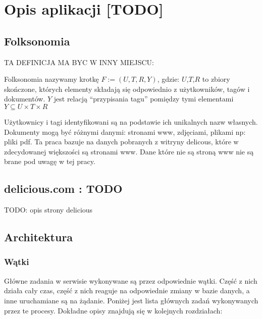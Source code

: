 \chapter{Opis aplikacji [TODO]}

\section{Folksonomia}

TA DEFINICJA MA BYC W INNY MIEJSCU: 

Folksonomia nazywamy krotkę $F := (U,T,R,Y)$, gdzie:
$U$,$T$,$R$ to zbiory skończone, których elementy składają się odpowiednio z użytkowników, tagów i dokumentów. $Y$ jest relacją “przypisania tagu” pomiędzy tymi elementami $Y \subseteq U \times T \times R$

Użytkownicy i tagi identyfikowani są na podstawie ich unikalnych nazw własnych. Dokumenty mogą być różnymi danymi: stronami www, zdjęciami, plikami np: pliki pdf. Ta praca bazuje na danych pobranych z witryny delicous, które w zdecydowanej większości są stronami www. Dane które nie są stroną www nie są brane pod uwagę w tej pracy. 

\section{delicious.com : TODO}

TODO: opis strony delicious

\section{Architektura}

\subsection{Wątki}

Główne zadania w serwisie wykonywane są przez odpowiednie wątki. Część z nich działa cały czas, część z nich reaguje na odpowiednie zmiany w bazie danych, a inne uruchamiane są na żądanie. Poniżej jest lista głównych zadań wykonywanych przez te procesy. Dokładne opisy znajdują się w kolejnych rozdziałach:

